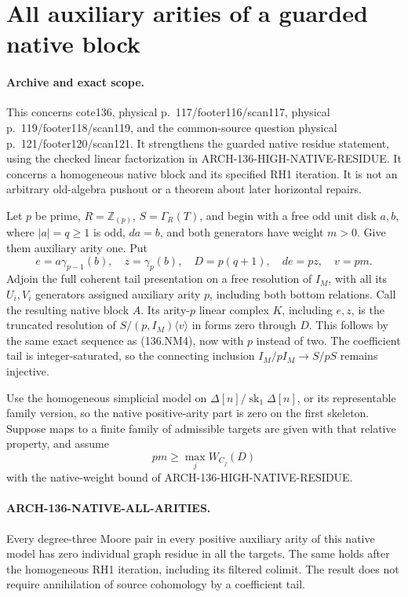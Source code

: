 \section{All auxiliary arities of a guarded native block}
\label{sec:136-native-all-arities}

\paragraph{Archive and exact scope.}
This concerns cote136, physical p.~117/footer116/scan117,
physical p.~119/footer118/scan119, and the common-source question
physical p.~121/footer120/scan121. It strengthens the guarded
native residue statement, using the checked linear factorization
in ARCH-136-HIGH-NATIVE-RESIDUE. It concerns a homogeneous native
block and its specified RH1 iteration. It is not an arbitrary
old-algebra pushout or a theorem about later horizontal repairs.

Let \(p\) be prime, \(R=\mathbb Z_{(p)}\),
\(S=\Gamma_R(T)\), and begin with a free odd unit disk
\(a,b\), where \(|a|=q\geq1\) is odd,
\(da=b\), and both generators have weight \(m>0\).
Give them auxiliary arity one. Put
\[
 e=a\gamma_{p-1}(b),\quad z=\gamma_p(b),\quad
 D=p(q+1),\quad de=pz,\quad v=pm.
                                                               \tag{136.NA1}
\]
Adjoin the full coherent tail presentation on a free resolution
of \(I_M\), with all its \(U_i,V_i\) generators assigned
auxiliary arity \(p\), including both bottom relations.
Call the resulting native block \(A\). Its arity-\(p\)
linear complex \(K\), including \(e,z\), is the truncated
resolution of \(S/(p,I_M)\langle v\rangle\) in forms
zero through \(D\). This follows by the same exact sequence
as (136.NM4), now with \(p\) instead of two. The coefficient
tail is integer-saturated, so the connecting inclusion
\(I_M/pI_M\to S/pS\) remains injective.

Use the homogeneous simplicial model on
\(\Delta[n]/\operatorname{sk}_1\Delta[n]\), or its
representable family version, so the native positive-arity
part is zero on the first skeleton. Suppose maps to a finite
family of admissible targets are given with that relative
property, and assume
\[
                    pm\geq\max_j W_{C_j}(D)
                                                               \tag{136.NA2}
\]
with the native-weight bound of ARCH-136-HIGH-NATIVE-RESIDUE.

\paragraph{ARCH-136-NATIVE-ALL-ARITIES.}
Every degree-three Moore pair in every positive auxiliary arity
of this native model has zero individual graph residue in all
the targets. The same holds after the homogeneous RH1 iteration,
including its filtered colimit. The result does not require
annihilation of source cohomology by a coefficient tail.

